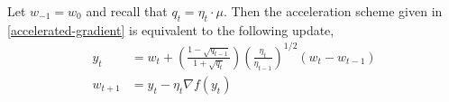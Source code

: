 \documentclass[10pt]{article} %
\newcommand{\yk}{y_t}
\newcommand{\wk}{w_t}
\newcommand{\wkk}{w_{t+1}}
\newcommand{\etak}{\eta_{t}}
\newcommand{\grad}{\nabla{} f}
\newcommand{\rbr}[1]{\left(#1\right)}
\begin{document}
\begin{lemma}\label{lemma:acceleration-reformulation}
    Let \( w_{-1} = w_0 \) and recall that \( q_t = \etak \cdot \mu \).
    Then the acceleration scheme given in \cref{accelerated-gradient} is equivalent to
    the following update,
    \begin{equation}\label{eq:momentum-acceleration}
        \begin{aligned}
            \yk
             & = \wk +
            \rbr{\frac{1 - \sqrt{q_{t-1}}}{1 + \sqrt{q_t}}}
            \rbr{\frac{\etak}{\eta_{t-1}}}^{1/2}
            \rbr{\wk - w_{t-1}}         \\
            \wkk
             & = \yk - \etak \grad(\yk) \\
        \end{aligned}
    \end{equation}
\end{lemma}
\end{document}
